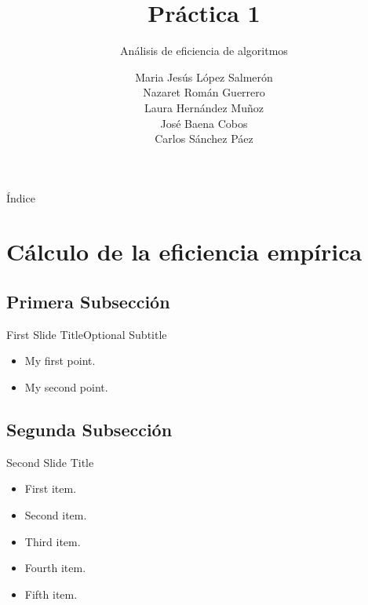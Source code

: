 \documentclass{beamer}
\title{Práctica 1}
\subtitle{Análisis de eficiencia de algoritmos}
\author{Maria Jesús López Salmerón \\ Nazaret Román Guerrero \\ Laura Hernández Muñoz \\ José Baena Cobos  \\ Carlos Sánchez Páez}
\begin{document}
\begin{frame}
  \titlepage
\end{frame}

\begin{frame}{Índice}
  \tableofcontents
\end{frame}

\section{Cálculo de la eficiencia empírica}

\subsection{Primera Subsección}

\begin{frame}{First Slide Title}{Optional Subtitle}
  \begin{itemize}
  \item {
    My first point.
  }
  \item {
    My second point.
  }
  \end{itemize}
\end{frame}

\subsection{Segunda Subsección}

\begin{frame}{Second Slide Title}
  \begin{itemize}
  \item {
    First item.
    \pause %
  }
  \item {   
    Second item.
  }
  \item<3-> {
    Third item.
  }
  \item<4-> {
    Fourth item.
  }
  \item<5-> {
    Fifth item. 
  }
  \end{itemize}
\end{frame}
\end{document}
